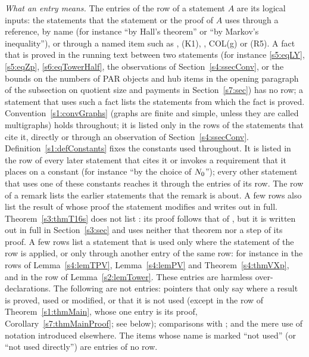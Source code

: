 \emph{What an entry means.} The entries of the row of a statement $A$ are
its logical inputs: the statements that the statement or the proof of $A$ uses
through a reference, by name (for instance ``by Hall's theorem'' or ``by
Markov's inequality''), or through a named item such as , (K1), ,
COL(g) or (R5). A fact that is proved in the running text between two
statements (for instance \eqref{s5:eqLY}, \eqref{s5:eqZp},
\eqref{s6:eqTowerHalf}, the observations of Section~\ref{s4:ssecConv}, or the
bounds on the numbers of PAR objects and hub items in the opening paragraph of
the subsection on quotient size and payments in Section~\ref{s7:sec}) has no
row; a statement that
uses such a fact lists the statements from which the fact is proved.
Convention~\ref{s1:convGraphs} (graphs are finite and simple, unless they are
called multigraphs) holds throughout; it is listed only in the rows of the
statements that cite it, directly or through an observation of
Section~\ref{s4:ssecConv}. Definition~\ref{s1:defConstants} fixes the constants
used throughout. It is listed in the row of every later statement that cites it
or invokes a requirement that it places on a constant (for instance ``by the
choice of $N_{0}$''); every other statement that uses one of these constants
reaches it through the entries of its row. The row of a remark lists the earlier
statements that the remark is about. A few rows also list the result of
\cite{BM} whose proof the statement modifies and writes out in full.
Theorem~\ref{s3:thmT16s} does not list \cite[Theorem~16]{BM}: its proof follows
that of \cite[Theorem~16]{BM}, but it is written out in full in
Section~\ref{s3:sec} and uses neither that theorem nor a step of its proof. A few
rows list a statement that is used only where the statement of the row is
applied, or only through another entry of the same row: for instance  in
the rows of Lemma~\ref{s4:lemTPV}, Lemma~\ref{s4:lemPV} and
Theorem~\ref{s4:thmVXp}, and  in the row of Lemma~\ref{s2:lemTower}. These
entries are harmless over-declarations. The following are not entries: pointers
that only say where a result is proved, used or modified, or that it is not
used (except in the row of Theorem~\ref{s1:thmMain}, whose one entry is its
proof, Corollary~\ref{s7:thmMainProof}; see below); comparisons with \cite{BM}; and the mere use of notation introduced
elsewhere. The items whose name is marked ``not used'' (or ``not used
directly'') are entries of no row.

